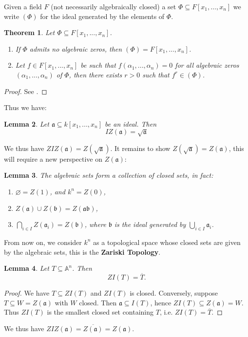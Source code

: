 \documentclass[12pt]{article}
\theoremstyle{plain}
\newtheorem{thm}{Theorem}[subsection] %
\newtheorem{lemma}[thm]{Lemma}
\theoremstyle{definition}
\newcommand{\bb}[1]{\mathbb{#1}}
\begin{document}
Given a field $F$ (not necessarily algebraically closed) a set $\Phi \subseteq F[x_1, \ldots, x_n]$ we write $(\Phi)$ for the ideal generated by the elements of $\Phi$.
\begin{thm}
\label{thm:hilbertsnullstellensatz}
Let $\Phi \subseteq F[x_1,...,x_n]$.
\begin{enumerate}
    \item\label{generates} If $\Phi$ admits no algebraic zeros, then $(\Phi) = F[x_1,...,x_n]$.
    \item\label{power} Let $f \in F[x_1,...,x_n]$ be such that $f(\alpha_1,...,\alpha_n) = 0$ for all algebraic zeros $(\alpha_1,...,\alpha_n)$ of $\Phi$, then there exists $r > 0$ such that $f^r \in (\Phi)$.
\end{enumerate}
\end{thm}
\begin{proof}
See \cite{algebra}.
\end{proof}
Thus we have:
\begin{lemma}
Let $\mathfrak{a} \subseteq k[x_1,...,x_n]$ be an ideal. Then
\begin{equation}\label{eq:IZ}
    IZ(\mathfrak{a}) = \sqrt{\mathfrak{a}}
\end{equation}
\end{lemma}
We thus have $ZIZ(\mathfrak{a}) = Z(\sqrt{\mathfrak{a}})$.  It remains to show $Z(\sqrt{\mathfrak{a}}) = Z(\mathfrak{a})$, this will require a new perspective on $Z(\mathfrak{a})$:
\begin{lemma}
The algebraic sets form a collection of closed sets, in fact:
\begin{enumerate}
    \item $\varnothing = Z(1)$, and $k^n = Z(0)$,
    \item $Z(\mathfrak{a}) \cup Z(\mathfrak{b}) = Z(\mathfrak{a}\mathfrak{b})$,
    \item $\bigcap_{i \in I}Z(\mathfrak{a}_i) = Z(\mathfrak{b})$, where $\mathfrak{b}$ is the ideal generated by $\bigcup_{i \in I}\mathfrak{a}_i$.
\end{enumerate}
\end{lemma}
From now on, we consider $k^n$ as a topological space whose closed sets are given by the algebraic sets, this is the \textbf{Zariski Topology}.
\begin{lemma}\label{lem:closure_zt}
Let $T\subseteq \bb A^n$. Then
\[
ZI(T)=\overline T.
\]
\end{lemma}
\begin{proof}
We have $T\subseteq ZI(T)$ and $ZI(T)$ is closed. Conversely, suppose $T\subseteq W=Z(\mathfrak a)$ with $W$ closed. Then $\mathfrak a\subseteq I(T)$, hence $ZI(T)\subseteq Z(\mathfrak a)=W$. Thus $ZI(T)$ is the smallest closed set containing $T$, i.e. $ZI(T)=\overline T$.
\end{proof}
We thus have $ZIZ(\mathfrak{a}) = \overline{Z(\mathfrak{a})} = Z(\mathfrak{a})$.
%
%
%
\end{document}
